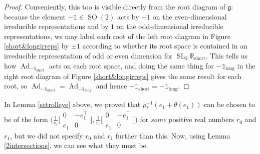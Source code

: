 \documentclass[12pt,a4paper]{amsart}
\theoremstyle{definition}
\DeclareMathOperator{\Ad}{Ad}
\DeclareMathOperator{\SOrth}{SO}
\DeclareMathOperator{\SLin}{SL}
\begin{document}
\begin{proof}
Conveniently, this too is visible directly from the root diagram of $\mathfrak{g}$: because the element $-\mathds{1}\in\SOrth(2)$ acts by $-1$ on the even-dimensional irreducible representations and by $1$ on the odd-dimensional irreducible representations, we may label each root of the left root diagram in Figure \ref{short&longirreps} by $\pm1$ according to whether its root space is contained in an irreducible representation of odd or even dimension for $\SLin_2\mathbb{R}_\text{short}$. This tells us how $\Ad_{-\mathds{1}_\text{short}}$ acts on each root space, and doing the same thing for $-\mathds{1}_\text{long}$ in the right root diagram of Figure \ref{short&longirreps} gives the same result for each root,
so $\Ad_{-\mathds{1}_\text{short}}\!=\Ad_{-\mathds{1}_\text{long}}$ and hence $-\mathds{1}_\text{short}=-\mathds{1}_\text{long}$.\mbox{\qedhere}

\end{proof}

In Lemma \ref{setrolleye} above, we proved that $\rho_*^{-1}(e_1+\theta(e_1))$ can be chosen to be of the form $\big(\tfrac{1}{r_0}\big[\begin{smallmatrix}0 & -e_1^\top \\ e_1 & 0\end{smallmatrix}\big],\tfrac{1}{r_1}\big[\begin{smallmatrix}0 & -e_1^\top \\ e_1 & 0\end{smallmatrix}\big]\big)$ for \textit{some} positive real numbers $r_0$ and $r_1$, but we did not specify $r_0$ and $r_1$ further than this. Now, using Lemma \ref{2intersections}, we can see what they must be.
\end{document}
